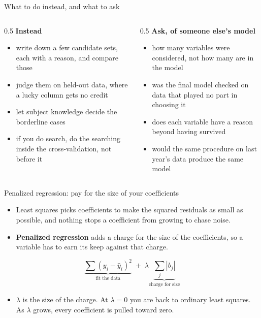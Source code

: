 \documentclass[aspectratio=169]{beamer}
\begin{document}
\begin{frame}{What to do instead, and what to ask}
\begin{columns}[T]
\begin{column}{0.5\textwidth}
\textbf{Instead}
\begin{itemize}\small
  \item write down a few candidate sets, each with a reason, and compare those
  \item judge them on held-out data, where a lucky column gets no credit
  \item let subject knowledge decide the borderline cases
  \item if you do search, do the searching inside the cross-validation, not before it
\end{itemize}
\end{column}
\begin{column}{0.5\textwidth}
\textbf{Ask, of someone else's model}
\begin{itemize}\small
  \item how many variables were considered, not how many are in the model
  \item was the final model checked on data that played no part in choosing it
  \item does each variable have a reason beyond having survived
  \item would the same procedure on last year's data produce the same model
\end{itemize}
\end{column}
\end{columns}
\end{frame}

\begin{frame}{Penalized regression: pay for the size of your coefficients}
\begin{itemize}
  \item Least squares picks coefficients to make the squared residuals as small as possible, and
        nothing stops a coefficient from growing to chase noise.
  \item \textbf{Penalized regression} adds a charge for the size of the coefficients, so a
        variable has to earn its keep against that charge.
\end{itemize}
\[
  \underbrace{\sum (y_i - \hat{y}_i)^2}_{\text{fit the data}}
  \;+\;
  \lambda \underbrace{\sum_j |b_j|}_{\text{charge for size}}
\]
\begin{itemize}
  \item $\lambda$ is the size of the charge. At $\lambda = 0$ you are back to ordinary least
        squares. As $\lambda$ grows, every coefficient is pulled toward zero.
\end{itemize}
\end{frame}
\end{document}
